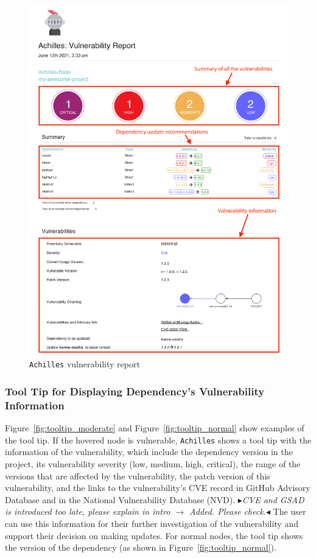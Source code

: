 \documentclass[conference]{IEEEtran}
\newcommand{\boxedtext}[1]{\fbox{\scriptsize\bfseries\textsf{#1}}}
\newcommand{\nota}[2]{
	\boxedtext{#1}
	{\small$\blacktriangleright$\emph{\textsl{#2}}$\blacktriangleleft$}
}
\newcommand{\todo}[1]{{\color{red}\nota{TODO}{#1}}}
\begin{document}
	\begin{figure}[tb]
		\centering
		\includegraphics[width=\columnwidth]{Figures/my-awesome-project-achilles-report-1.png}
		\caption{\texttt{Achilles} vulnerability report}
		\label{fig:vul-report-1}
	\end{figure}
	
	\subsubsection{Tool Tip for Displaying Dependency's Vulnerability Information}
	Figure~\ref{fig:tooltip_moderate} and Figure~\ref{fig:tooltip_normal} show examples of the tool tip. If the hovered node is vulnerable, \texttt{Achilles} shows a tool tip with the information of the vulnerability, which include the dependency version in the project, its vulnerability severity (low, medium, high, critical), the range of the versions that are affected by the vulnerability, the patch version of this vulnerability, and the links to the vulnerability's CVE record in GitHub Advisory Database and in the National Vulnerability Database (NVD).
	\todo{CVE and GSAD is introduced too late, please explain in intro $\rightarrow$ Added. Please check.}
	The user can use this information for their further investigation of the vulnerability and support their decision on making updates. For normal nodes, the tool tip shows the version of the dependency (as shown in Figure~\ref{fig:tooltip_normal}).
\end{document}
